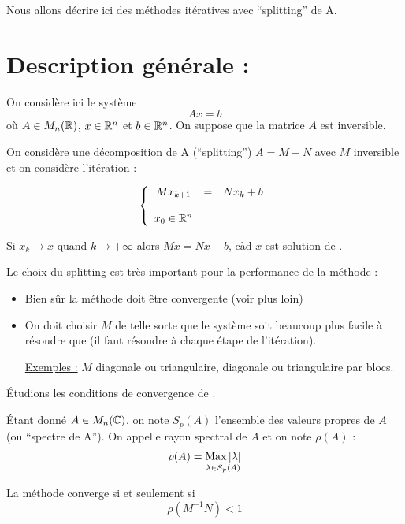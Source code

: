 Nous allons décrire ici des méthodes itératives avec ``splitting'' de A.


\section{Description générale :}

On considère ici le système
\begin{equation}
    \label{eq:eqdiff}
    Ax = b
\end{equation} 
où $A \in M_n(\mathbb{R})$, $x \in \mathbb{R}^n$ et $b \in \mathbb{R}^n$. On suppose que la matrice $A$ est inversible.


On considère une décomposition de A (``splitting'') $A=M-N$ avec $M$ inversible et on considère l'itération :

\begin{equation}
\left\lbrace
\begin{array}{ccc}
    Mx_{k+1} & = & Nx_k + b\\
    \\
    x_0 \in \mathbb{R}^n
    \label{eq:2}
\end{array}\right.
\end{equation}

Si $x_k \to x$ quand $k \to +\infty$ alors $Mx = Nx + b$, càd $x$ est solution de .

Le choix du splitting est très important pour la performance de la méthode :
\begin{itemize}
    \item Bien sûr la méthode doit être convergente (voir plus loin)
    \item On doit choisir $M$ de telle sorte que le système  soit beaucoup plus facile à résoudre que  (il faut résoudre  à chaque étape de l'itération).

        \underline{Exemples :} $M$ diagonale ou triangulaire, diagonale ou triangulaire par blocs.
\end{itemize}

Étudions les conditions de convergence de .

\begin{fdef}
    Étant donné $A \in M_n(\mathbb{C})$, on note $S_p(A)$ l'ensemble des valeurs propres de $A$ (ou ``spectre de A''). On appelle rayon spectral de $A$ et on note $\rho(A)$ :
\[
    \rho (A) = \underset{\lambda \in S_p(A)}{\operatorname{Max}|\lambda|}
\]
\end{fdef}

\begin{ftheo}
    La méthode  converge si et seulement si $$\rho(M^{-1}N) < 1$$
\end{ftheo}

